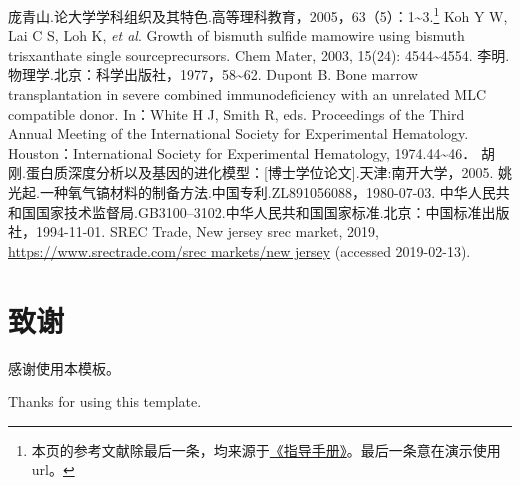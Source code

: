 \documentclass[zihao = -4, linespread = 1.5]{ctexart} %
\begin{document}
\clearpage
\begin{thebibliography}{99}\label{sec:bib}
\addtolength{\itemsep}{-1.5ex} %
庞青山.论大学学科组织及其特色.高等理科教育，2005，63（5）：1\~{}3.\footnote{本页的参考文献除最后一条，均来源于\href{http://jwc.nankai.edu.cn/bylwwsjw/list.htm}{《指导手册》}。最后一条意在演示使用url。}
Koh Y W, Lai C S, Loh K, \emph{et al}. Growth of bismuth sulfide mamowire using bismuth trisxanthate single sourceprecursors. Chem Mater, 2003, 15(24): 4544\~{}4554.
李明.物理学.北京：科学出版社，1977，58\~{}62.
Dupont B. Bone marrow transplantation in severe combined immunodeficiency with an unrelated MLC compatible donor. In：White H J, Smith R, eds. Proceedings of the Third Annual Meeting of the International Society for Experimental Hematology. Houston：International Society for Experimental Hematology, 1974.44\~{}46．
胡  刚.蛋白质深度分析以及基因的进化模型：[博士学位论文].天津:南开大学，2005.
姚光起.一种氧气镐材料的制备方法.中国专利.ZL891056088，1980-07-03.
中华人民共和国国家技术监督局.GB3100--3102.中华人民共和国国家标准.北京：中国标准出版社，1994-11-01.
SREC Trade, New jersey srec market, 2019, \url{https://www.srectrade.com/srec markets/new jersey} (accessed 2019-02-13).
\end{thebibliography}



\clearpage
\section{\texorpdfstring{致\quad 谢}{致谢}}
感谢使用本模板。

Thanks for using this template.
\end{document}

